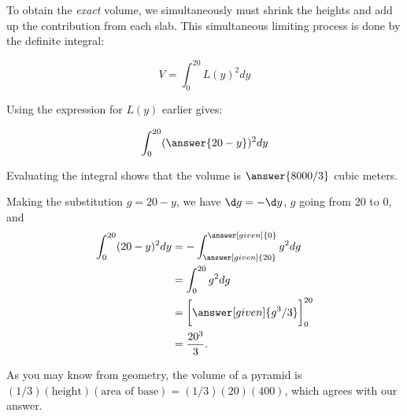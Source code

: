 \documentclass{ximera}
\begin{document}
\begin{exercise}
To obtain the \emph{exact} volume, we simultaneously must shrink the heights and add up the contribution from each slab.  This simultaneous limiting process is done by the definite integral:

\[
V = \int_{0}^{20} L(y)^2 dy
\]

Using the expression for $L(y)$ earlier gives:

\[
\int_0^{20} (\answer{20-y})^2 dy
\]

Evaluating the integral shows that the volume is $\answer{8000/3}$ cubic meters.

\begin{hint}

Making the substitution $g = 20-y $, we have $\d g = - \d y$, $g$ going from $20$ to $0$, and 
	\begin{align*}
	\int_0^{20} (20-y)^2 dy &= -\int_{\answer[given]{20}}^{\answer[given]{0}} g^2 dg\\
		&= \int_0^{20} g^2 dg\\
		&= \bigg[\answer[given]{g^3/3}\bigg]_0^{20}\\
		&= \frac{20^3}{3}.
	\end{align*}

\end{hint}

As you may know from geometry, the volume of a pyramid is
$(1/3)(\text{height})(\text{area of base})=(1/3)(20)(400)$, which
agrees with our answer.


\end{exercise}
\end{document}
